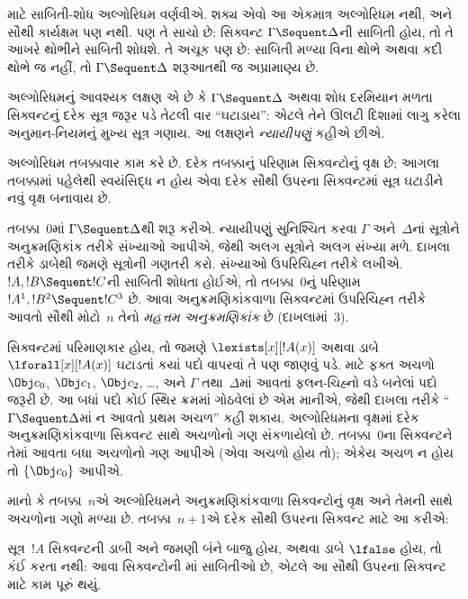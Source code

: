 \begingroup
\makeatletter{}\makeatother


\label{guunit:OLP-0683}


 માટે
સાબિતી-શોધ
અલ્ગોરિધમ વર્ણવીએ.
શક્ય એવો
આ એકમાત્ર
અલ્ગોરિધમ નથી,
અને સૌથી
કાર્યક્ષમ પણ
નથી. પણ તે
સાચો છે:
સિક્વન્ટ
$\Gamma \Sequent \Delta$ની
સાબિતી
હોય, તો
તે આખરે
થોભીને
સાબિતી
શોધશે. તે
અચૂક પણ
છે: સાબિતી
મળ્યા વિના
થોભે અથવા
કદી થોભે
જ નહીં,
તો
$\Gamma
\Sequent \Delta$
શરૂઆતથી જ
અપ્રામાણ્ય
છે.

અલ્ગોરિધમનું
આવશ્યક લક્ષણ
એ છે કે
$\Gamma \Sequent \Delta$
અથવા શોધ
દરમિયાન મળતા
સિક્વન્ટનું
દરેક
સૂત્ર
જરૂર પડે
તેટલી વાર
``ઘટાડાય'':
એટલે તેને
ઊલટી દિશામાં
લાગુ કરેલા
અનુમાન-નિયમનું
મુખ્ય સૂત્ર
ગણાય. આ
લક્ષણને
\emph{ન્યાયીપણું}
કહીએ છીએ.

અલ્ગોરિધમ
તબક્કાવાર
કામ કરે છે.
દરેક તબક્કાનું
પરિણામ
સિક્વન્ટોનું
વૃક્ષ છે;
આગલા તબક્કામાં
પહેલેથી સ્વયંસિદ્ધ
ન હોય એવા
દરેક સૌથી
ઉપરના સિક્વન્ટમાં
સૂત્ર
ઘટાડીને
નવું વૃક્ષ
બનાવાય છે.

તબક્કા~$0$માં
$\Gamma \Sequent \Delta$થી
શરૂ કરીએ.
ન્યાયીપણું
સુનિશ્ચિત કરવા
$\Gamma$
અને~$\Delta$નાં
સૂત્રોને
અનુક્રમણિકાંક
તરીકે સંખ્યાઓ
આપીએ, જેથી
અલગ
સૂત્રોને
અલગ સંખ્યા
મળે. દાખલા
તરીકે ડાબેથી
જમણે
સૂત્રોની
ગણતરી કરો.
સંખ્યાઓ
ઉપરિચિહ્ન
તરીકે
લખીએ.
$!A, !B \Sequent !C$ની
સાબિતી
શોધતા હોઈએ,
તો તબક્કા~$0$નું
પરિણામ
$!A^1, !B^2 \Sequent !C^3$
છે. આવા
અનુક્રમણિકાંકવાળા
સિક્વન્ટમાં
ઉપરિચિહ્ન
તરીકે આવતો
સૌથી મોટો~$n$
તેનો
\emph{મહત્તમ
અનુક્રમણિકાંક}
છે (દાખલામાં~$3$).

સિક્વન્ટમાં
પરિમાણકાર
હોય, તો જમણે
$\lexists[x][!A(x)]$
અથવા ડાબે
$\lforall[x][!A(x)]$
ઘટાડતાં કયાં
પદો વાપરવાં
તે પણ જાણવું
પડે. માટે
ફક્ત
અચળો
$\Obj c_0$,
$\Obj c_1$,
$\Obj c_2$,
\dots, અને
$\Gamma$
તથા~$\Delta$માં
આવતાં ફલન-ચિહ્નો
વડે બનેલાં
પદો જરૂરી
છે. આ
બધાં પદો
કોઈ સ્થિર
ક્રમમાં ગોઠવેલાં
છે એમ
માનીએ, જેથી
દાખલા તરીકે
``$\Gamma \Sequent \Delta$માં
ન આવતો
પ્રથમ
અચળ''
કહી શકાય.
અલ્ગોરિધમના
વૃક્ષમાં દરેક
અનુક્રમણિકાંકવાળા
સિક્વન્ટ સાથે
અચળોનો
ગણ સંકળાયેલો
છે. તબક્કા~$0$ના
સિક્વન્ટને
તેમાં આવતા
બધા
અચળોનો
ગણ આપીએ
(એવા અચળો
હોય તો);
એકેય અચળ
ન
હોય તો
$\{\Obj c_0\}$
આપીએ.

માનો કે
તબક્કા~$n$એ
અલ્ગોરિધમને
અનુક્રમણિકાંકવાળા
સિક્વન્ટોનું
વૃક્ષ અને
તેમની સાથે
અચળોના
ગણો મળ્યા
છે. તબક્કા~$n+1$એ
દરેક સૌથી
ઉપરના સિક્વન્ટ
માટે આ
કરીએ:

સૂત્ર~$!A$
સિક્વન્ટની
ડાબી અને
જમણી બંને
બાજુ હોય,
અથવા ડાબે
$\lfalse$
હોય, તો
કંઈ કરતા
નથી: આવા
સિક્વન્ટોની
માં
સાબિતીઓ
છે, એટલે
આ સૌથી
ઉપરના સિક્વન્ટ
માટે કામ
પૂરું થયું.

